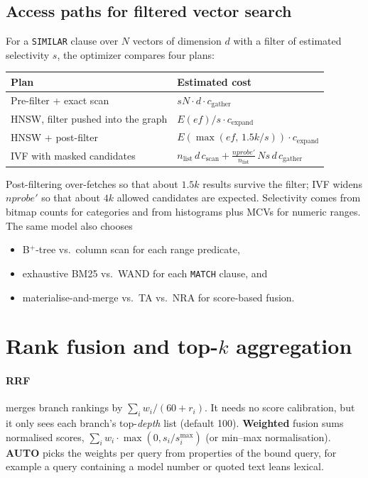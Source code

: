 \documentclass[11pt,a4paper]{article}
\newcommand{\code}[1]{\texttt{\small #1}}
\begin{document}
\subsection{Access paths for filtered vector search}
For a \code{SIMILAR} clause over $N$ vectors of dimension $d$ with a filter of estimated selectivity $s$,
the optimizer compares four plans:
\begin{center}
\begin{tabular}{ll}
\toprule
Plan & Estimated cost \\
\midrule
Pre-filter + exact scan & $sN\cdot d\cdot c_{\text{gather}}$ \\
HNSW, filter pushed into the graph & $E(ef)/s \cdot c_{\text{expand}}$ \\
HNSW + post-filter & $E\!\left(\max(ef,\, 1.5k/s)\right)\cdot c_{\text{expand}}$ \\
IVF with masked candidates & $n_{\text{list}}\, d\, c_{\text{scan}} + \tfrac{nprobe'}{n_{\text{list}}}\, N s\, d\, c_{\text{gather}}$ \\
\bottomrule
\end{tabular}
\end{center}
Post-filtering over-fetches so that about $1.5k$ results survive the filter; IVF widens $nprobe'$ so
that about $4k$ allowed candidates are expected. Selectivity comes from bitmap counts for categories
and from histograms plus MCVs for numeric ranges. The same model also chooses
\begin{itemize}
  \item B$^+$-tree vs.\ column scan for each range predicate,
  \item exhaustive BM25 vs.\ WAND for each \code{MATCH} clause, and
  \item materialise-and-merge vs.\ TA vs.\ NRA for score-based fusion.
\end{itemize}

\section{Rank fusion and top-\texorpdfstring{$k$}{k} aggregation}
\label{sec:fusion}

\paragraph{RRF} merges branch rankings by $\sum_i w_i/(60 + r_i)$. It needs no score calibration, but
it only sees each branch's top-\emph{depth} list (default 100). \textbf{Weighted} fusion sums normalised
scores, $\sum_i w_i \cdot \max(0, s_i/s_i^{\max})$ (or min--max normalisation). \textbf{AUTO} picks the
weights per query from properties of the bound query, for example a query containing a model number
or quoted text leans lexical.
\end{document}
